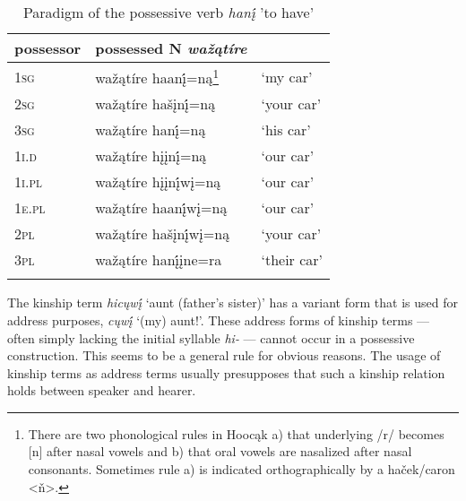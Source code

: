 \documentclass[output=paper]{LSP/langsci}
\begin{document}
\begin{table} 
\caption{Paradigm of the possessive verb \textit{hanį́} 'to have'} \label{haveparadigm}
\begin{tabular}[h!]{ l l l }
\lsptoprule
possessor	& possessed N \textit{waž\k{a}tíre} \\
\midrule
\textsc{1sg}	 & waž\k{a}tíre haanį́=n\k{a}\footnote{There are two phonological rules in Hooc\k{a}k a) that underlying /r/ becomes [n] after nasal vowels and b) that oral vowels are nasalized after nasal consonants. Sometimes rule a) is indicated orthographically by a ha\v{c}ek/caron <\v{n}>.} & `my car' \\
 
\textsc{2sg}	 & waž\k{a}tíre hašįnį́=n\k{a} & `your car' \\
 
\textsc{3sg}	 & waž\k{a}tíre hanį́=n\k{a} & `his car' \\
 
\textsc{1i.d}	& waž\k{a}tíre hįįnį́=n\k{a} & `our car' \\
 
\textsc{1i.pl} & waž\k{a}tíre hįįnį́wį=n\k{a} & `our car' \\
 
\textsc{1e.pl} & waž\k{a}tíre haanį́wį=n\k{a} & `our car' \\
 
\textsc{2pl}	& waž\k{a}tíre hašįnį́wį=n\k{a} & `your car' \\
 
\textsc{3pl}	& waž\k{a}tíre hanį́įne=ra & `their car' \\
\lspbottomrule
\end{tabular}
\end{table}

The kinship term \textit{hicųwį́} `aunt (father's sister)' has a variant form that is used for address purposes, \textit{cųwį́} `(my) aunt!'. These address forms of kinship terms --- often simply lacking the initial syllable \textit{hi-} --- cannot occur in a possessive construction. This seems to be a general rule for obvious reasons. The usage of kinship terms as address terms usually presupposes that such a kinship relation holds between speaker and hearer. 
\end{document}
